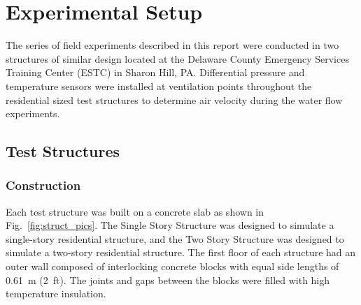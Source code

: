 \documentclass[12pt,oneside]{book}
\begin{document}
\section{Experimental Setup}
\label{sec:exp_setup}
The series of field experiments described in this report were conducted in two structures of similar design located at the Delaware County Emergency Services Training Center (ESTC) in Sharon Hill, PA. Differential pressure and temperature sensors were installed at ventilation points throughout the residential sized test structures to determine air velocity during the water flow experiments.  

\subsection{Test Structures}
\label{sec:test_structs}

\subsubsection{Construction}
\label{sec:construction}
Each test structure was built on a concrete slab as shown in Fig.~\ref{fig:struct_pics}. The Single Story Structure was designed to simulate a single-story residential structure, and the Two Story Structure was designed to simulate a two-story residential structure. The first floor of each structure had an outer wall composed of interlocking concrete blocks with equal side lengths of 0.61~m (2~ft). The joints and gaps between the blocks were filled with high temperature insulation.
\end{document}
